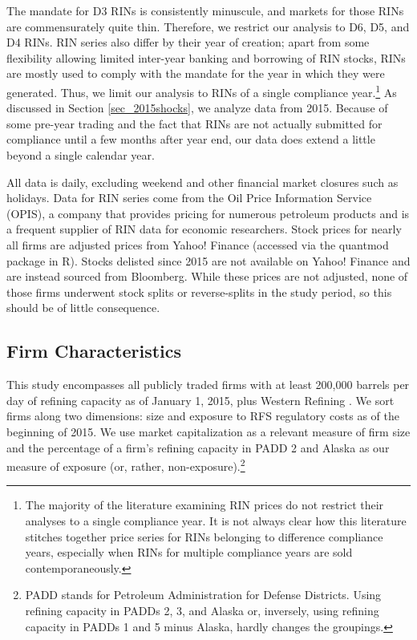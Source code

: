 \documentclass[11pt]{article}
\begin{document}
The mandate for D3 RINs is consistently minuscule, and markets for those RINs are commensurately quite thin. Therefore, we restrict our analysis to D6, D5, and D4 RINs. RIN series also differ by their year of creation; apart from some flexibility allowing limited inter-year banking and borrowing of RIN stocks, RINs are mostly used to comply with the mandate for the year in which they were generated. Thus, we limit our analysis to RINs of a single compliance year.\footnote{The majority of the literature examining RIN prices do not restrict their analyses to a single compliance year. It is not always clear how this literature stitches together price series for RINs belonging to difference compliance years, especially when RINs for multiple compliance years are sold contemporaneously.} As discussed in Section \ref{sec_2015shocks}, we analyze data from 2015. Because of some pre-year trading and the fact that RINs are not actually submitted for compliance until a few months after year end, our data does extend a little beyond a single calendar year. 

All data is daily, excluding weekend and other financial market closures such as holidays. Data for RIN series come from the Oil Price Information Service (OPIS), a company that provides pricing for numerous petroleum products and is a frequent supplier of RIN data for economic researchers. Stock prices for nearly all firms are adjusted prices from Yahoo! Finance (accessed via the quantmod package in R). Stocks delisted since 2015 are not available on Yahoo! Finance and are instead sourced from Bloomberg. While these prices are not adjusted, none of those firms underwent stock splits or reverse-splits in the study period, so this should be of little consequence.

\subsection{Firm Characteristics}\label{sec_firmcharacter}
This study encompasses all publicly traded firms with at least 200,000 barrels per day of refining capacity as of January 1, 2015, plus Western Refining \citep{EnergyInformationAdministration2015}. We sort firms along two dimensions: size and exposure to RFS regulatory costs as of the beginning of 2015. We use market capitalization as a relevant measure of firm size \citep{Fama1992} and the percentage of a firm's refining capacity in PADD 2 and Alaska as our measure of exposure (or, rather, non-exposure).\footnote{PADD stands for Petroleum Administration for Defense Districts. Using refining capacity in PADDs 2, 3, and Alaska or, inversely, using refining capacity in PADDs 1 and 5 minus Alaska, hardly changes the groupings.}
\end{document}
